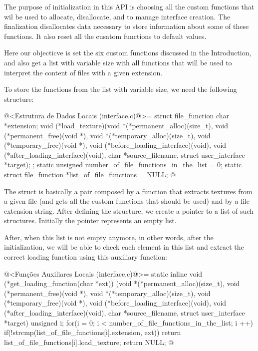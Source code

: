
The purpose of initialization in this API is choosing all the custom
functions that wil be used to allocate, disallocate, and to manage
interface creation. The finalization disallocates data necessary to
store information about some of these functions. It also reset all the
cusatom functions to default values.


Here our objecticve is set the six custom functions discussed in the
Introduction, and also get a list with variable size with all
functions that will be used to interpret the content of files with a
given extension.

To store the functions from the list with variable size, we need the
following structure:

\iniciocodigo
@<Estrutura de Dados Locais (interface.c)@>=
struct file_function {
  char *extension;
  void (*load_texture)(void *(*permanent_alloc)(size_t),
                      void (*permanent_free)(void *),
                      void *(*temporary_alloc)(size_t),
                      void (*temporary_free)(void *),
                      void (*before_loading_interface)(void),
                      void (*after_loading_interface)(void),
                      char *source_filename, struct user_interface *target);
};
static unsigned number_of_file_functions_in_the_list = 0;
static struct file_function *list_of_file_functions = NULL;
@
\fimcodigo

The struct is basically a pair composed by a function that extracts
textures from a given file (and gets all the custom functions that
should be used) and by a file extension string. After defining the
structure, we create a pointer to a list of such structures. Initially
the pointer represents an empty list.

After, when this list is not empty anymore, in other words, after the
initialization, we will be able to check each element in this list and
extract the correct loading function using this auxiliary function:

\iniciocodigo
@<Funções Auxiliares Locais (interface.c)@>=
static inline void (*get_loading_function(char *ext))
                          (void *(*permanent_alloc)(size_t),
                           void (*permanent_free)(void *),
                           void *(*temporary_alloc)(size_t),
                           void (*temporary_free)(void *),
                           void (*before_loading_interface)(void),
                           void (*after_loading_interface)(void),
                           char *source_filename, struct user_interface *target){
  unsigned i;
  for(i = 0; i < number_of_file_functions_in_the_list; i ++){
    if(!strcmp(list_of_file_functions[i].extension, ext))
      return list_of_file_functions[i].load_texture;
  }
  return NULL;
}
@
\fimcodigo

